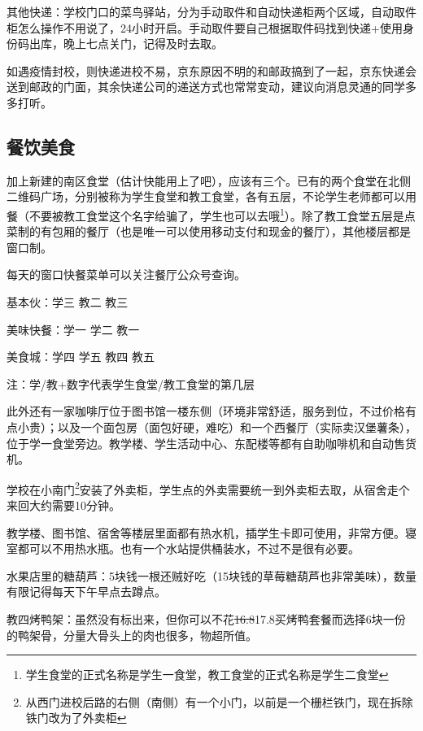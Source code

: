 其他快递：学校门口的菜鸟驿站，分为手动取件和自动快递柜两个区域，自动取件柜怎么操作不用说了，24小时开启。手动取件要自己根据取件码找到快递+使用身份码出库，晚上七点关门，记得及时去取。

如遇疫情封校，则快递进校不易，京东原因不明的和邮政搞到了一起，京东快递会送到邮政的门面，其余快递公司的递送方式也常常变动，建议向消息灵通的同学多多打听。

\subsection*{餐饮美食}


加上新建的南区食堂（估计快能用上了吧），应该有三个。已有的两个食堂在北侧二维码广场，分别被称为学生食堂和教工食堂，各有五层，不论学生老师都可以用餐（不要被教工食堂这个名字给骗了，学生也可以去哦\footnote{学生食堂的正式名称是学生一食堂，教工食堂的正式名称是学生二食堂}）。除了教工食堂五层是点菜制的有包厢的餐厅（也是唯一可以使用移动支付和现金的餐厅），其他楼层都是窗口制。

每天的窗口快餐菜单可以关注餐厅公众号查询。

基本伙：学三 教二 教三

美味快餐：学一 学二 教一

美食城：学四 学五 教四 教五

注：学/教+数字代表学生食堂/教工食堂的第几层

此外还有一家咖啡厅位于图书馆一楼东侧（环境非常舒适，服务到位，不过价格有点小贵）；以及一个面包房（面包好硬，难吃）和一个西餐厅（实际卖汉堡薯条），位于学一食堂旁边。教学楼、学生活动中心、东配楼等都有自助咖啡机和自动售货机。


学校在小南门\footnote{从西门进校后路的右侧（南侧）有一个小门，以前是一个栅栏铁门，现在拆除铁门改为了外卖柜}安装了外卖柜，学生点的外卖需要统一到外卖柜去取，从宿舍走个来回大约需要10分钟。


教学楼、图书馆、宿舍等楼层里面都有热水机，插学生卡即可使用，非常方便。寝室都可以不用热水瓶。也有一个水站提供桶装水，不过不是很有必要。


水果店里的糖葫芦：5块钱一根还贼好吃（15块钱的草莓糖葫芦也非常美味），数量有限记得每天下午早点去蹲点。

教四烤鸭架：虽然没有标出来，但你可以不花\sout{16.8}17.8买烤鸭套餐而选择6块一份的鸭架骨，分量大骨头上的肉也很多，物超所值。

